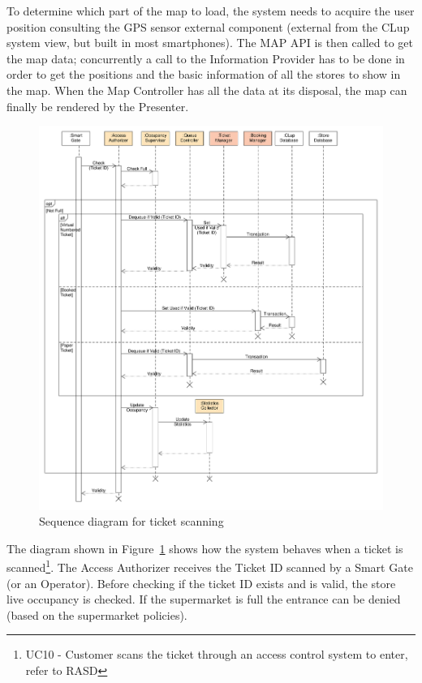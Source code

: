 To determine which part of the map to load, the system needs to acquire the user position consulting the GPS sensor external component (external from the CLup system view, but built in most smartphones). The MAP API is then called to get the map data; concurrently a call to the Information Provider has to be done in order to get the positions and the basic information of all the stores to show in the map. When the Map Controller has all the data at its disposal, the map can finally be rendered by the Presenter.

\begin{figure}[H]
    \hspace*{-1.8cm}
    \includegraphics[width=1.2\textwidth]{Images/UML_ticket_scan_sequence.pdf}
    \caption{\label{fig:UML_ticket_scan_sequence}Sequence diagram for ticket scanning}
\end{figure}
The diagram shown in Figure~\ref{fig:UML_ticket_scan_sequence} shows how the system behaves when a ticket is scanned\footnote{UC10 - Customer scans the ticket through an access control system to enter, refer to RASD}. The Access Authorizer receives the Ticket ID scanned by a Smart Gate (or an Operator). Before checking if the ticket ID exists and is valid, the store live occupancy is checked. If the supermarket is full the entrance can be denied (based on the supermarket policies).

